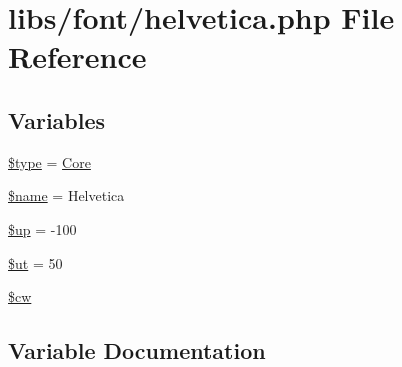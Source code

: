 \hypertarget{helvetica_8php}{}\section{libs/font/helvetica.php File Reference}
\label{helvetica_8php}
\subsection*{Variables}
\begin{DoxyCompactItemize}
\item 
\hyperlink{helvetica_8php_a9a4a6fba2208984cabb3afacadf33919}{\$type} = \textquotesingle{}\hyperlink{class_core}{Core}\textquotesingle{}
\item 
\hyperlink{helvetica_8php_ab2fc40d43824ea3e1ce5d86dee0d763b}{\$name} = \textquotesingle{}Helvetica\textquotesingle{}
\item 
\hyperlink{helvetica_8php_a6b5ad2ac55f9df46e8f34e78fbd6f176}{\$up} = -\/100
\item 
\hyperlink{helvetica_8php_aadd3f841051043ee58e587e840e8dd0b}{\$ut} = 50
\item 
\hyperlink{helvetica_8php_ac2951b03dbb0317e6c61ec920b7479dc}{\$cw}
\end{DoxyCompactItemize}


\subsection{Variable Documentation}
\hypertarget{helvetica_8php_ac2951b03dbb0317e6c61ec920b7479dc}{}
